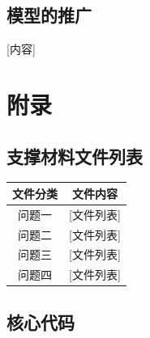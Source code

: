 \documentclass[a4paper,12pt]{article}
\begin{document}
	\subsection{模型的推广}
	[内容]
	
	\newpage
	
	\section{附录}
	
	\subsection{支撑材料文件列表}
	\begin{table}[H]
		\centering
		\begin{tabular}{c|c}
			\hline
			\textbf{文件分类} & \textbf{文件内容} \\
			\hline
			问题一 & [文件列表] \\
			问题二 & [文件列表] \\
			问题三 & [文件列表] \\
			问题四 & [文件列表] \\
			\hline
		\end{tabular}
	\end{table}
	
	\subsection{核心代码}
	\begin{lstlisting}[language=Matlab, basicstyle=\small\ttfamily, caption=核心算法代码]
		% [代码内容]
	\end{lstlisting}
	
\end{document}
